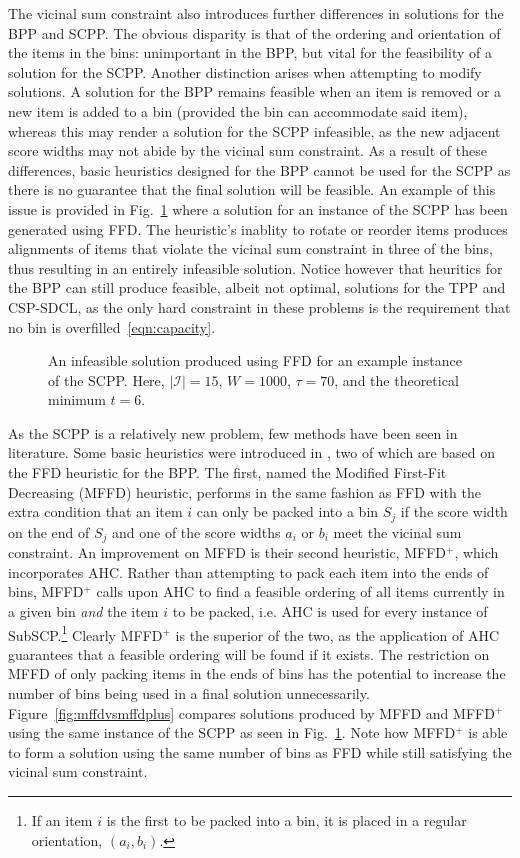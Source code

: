 \documentclass[authoryear]{elsarticle}
\begin{document}
The vicinal sum constraint also introduces further differences in solutions for the BPP and SCPP. The obvious disparity is that of the ordering and orientation of the items in the bins: unimportant in the BPP, but vital for the feasibility of a solution for the SCPP. Another distinction arises when attempting to modify solutions. A solution for the BPP remains feasible when an item is removed or a new item is added to a bin (provided the bin can accommodate said item), whereas this may render a solution for the SCPP infeasible, as the new adjacent score widths may not abide by the vicinal sum constraint. As a result of these differences, basic heuristics designed for the BPP cannot be used for the SCPP as there is no guarantee that the final solution will be feasible.  An example of this issue is provided in Fig.~\ref{fig:ffd} where a solution for an instance of the SCPP has been generated using FFD. The heuristic's inablity to rotate or reorder items produces alignments of items that violate the vicinal sum constraint in three of the bins, thus resulting in an entirely infeasible solution. Notice however that heuritics for the BPP can still produce feasible, albeit not optimal, solutions for the TPP and CSP-SDCL, as the only hard constraint in these problems is the requirement that no bin is overfilled~\eqref{eqn:capacity}.

\begin{figure}[h]	
	\centering
	
	\caption{An infeasible solution produced using FFD for an example instance of the SCPP. Here, $|\mathcal{I}| = 15$, $W = 1000$, $\tau = 70$, and the theoretical minimum $t = 6$.}	
	\label{fig:ffd}
\end{figure}

\noindent As the SCPP is a relatively new problem, few methods have been seen in literature. Some basic heuristics were introduced in \citet{hawa2018}, two of which are based on the FFD heuristic for the BPP. The first, named the Modified First-Fit Decreasing (MFFD) heuristic, performs in the same fashion as FFD with the extra condition that an item $i$ can only be packed into a bin $S_j$ if the score width on the end of $S_j$ and one of the score widths $a_i$ or $b_i$ meet the vicinal sum constraint. An improvement on MFFD is their second heuristic, MFFD$^+$, which incorporates AHC. Rather than attempting to pack each item into the ends of bins, MFFD$^+$ calls upon AHC to find a feasible ordering of all items currently in a given bin \emph{and} the item $i$ to be packed, i.e. AHC is used for every instance of SubSCP.\footnote{If an item $i$ is the first to be packed into a bin, it is placed in a regular orientation, $(a_i, b_i)$.} Clearly MFFD$^+$ is the superior of the two, as the application of AHC guarantees that a feasible ordering will be found if it exists. The restriction on MFFD of only packing items in the ends of bins has the potential to increase the number of bins being used in a final solution unnecessarily. Figure~\ref{fig:mffdvsmffdplus} compares solutions produced by MFFD and MFFD$^+$ using the same instance of the SCPP as seen in Fig.~\ref{fig:ffd}. Note how MFFD$^+$ is able to form a solution using the same number of bins as FFD while still satisfying the vicinal sum constraint.
\end{document}
